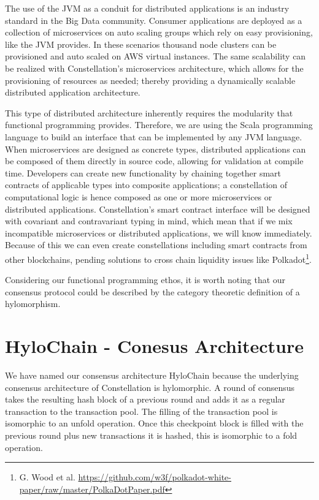 \documentclass{article}
\begin{document}
The use of the JVM as a conduit for distributed applications is an industry standard in the Big Data community. Consumer applications are deployed as a collection of microservices on auto scaling groups which rely on easy provisioning, like the JVM provides. In these scenarios thousand node clusters can be provisioned and auto scaled on AWS virtual instances. The same scalability can be realized with Constellation's microservices architecture, which allows for the provisioning of resources as needed; thereby providing a dynamically scalable distributed application architecture. 

This type of distributed architecture inherently requires the modularity that functional programming provides. Therefore, we are using the Scala programming language to build an interface that can be implemented by any JVM language. When microservices are designed as concrete types, distributed applications can be composed of them directly in source code, allowing for validation at compile time. Developers can create new functionality by chaining together smart contracts of applicable types into composite applications; a constellation of computational logic is hence composed as one or more microservices or distributed applications. Constellation's smart contract interface will be designed with covariant and contravariant typing in mind, which mean that if we mix incompatible microservices or distributed applications, we will know immediately. Because of this we can even create constellations including smart contracts from other blockchains, pending solutions to cross chain liquidity issues like Polkadot\footnote{G. Wood et al. \url{https://github.com/w3f/polkadot-white-paper/raw/master/PolkaDotPaper.pdf}}.

Considering our functional programming ethos, it is worth noting that our consensus protocol could be described by the category theoretic definition of a hylomorphism.

\section{HyloChain - Conesus Architecture}
We have named our consensus architecture HyloChain because the underlying consensus architecture of Constellation is hylomorphic. A round of consensus takes the resulting hash block of a previous round and adds it as a regular transaction to the transaction pool. The filling of the transaction pool is isomorphic to an unfold operation. Once this checkpoint block is filled with the previous round plus new transactions it is hashed, this is isomorphic to a fold operation. 
\end{document}
